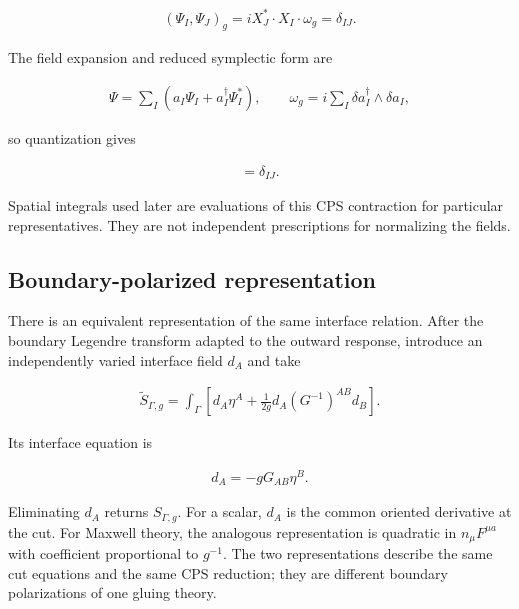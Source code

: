 \begin{align}
(\Psi_I,\Psi_J)_g
=iX_J^*\mathbin{\cdot}X_I\mathbin{\cdot}\omega_g
=\delta_{IJ}.
\end{align}

The field expansion and reduced symplectic form are

\begin{align}
\Psi=\sum_I\left(a_I\Psi_I+a_I^\dagger\Psi_I^*\right),
\qquad
\omega_g=i\sum_I\delta a_I^\dagger\wedge\delta a_I,
\end{align}

so quantization gives

\begin{align}
[a_I,a_J^\dagger]=\delta_{IJ}.
\end{align}

Spatial integrals used later are evaluations of this CPS contraction for particular representatives. They are not independent prescriptions for normalizing the fields.

\subsection{Boundary-polarized representation}\label{subsec:boundary-polarized}

There is an equivalent representation of the same interface relation. After the boundary Legendre transform adapted to the outward response, introduce an independently varied interface field $d_A$ and take

\begin{align}
\widetilde S_{\Gamma,g}
=\int_{\Gamma}\left[
d_A\eta^A+\frac{1}{2g}d_A(G^{-1})^{AB}d_B
\right].
\end{align}

Its interface equation is

\begin{align}
d_A=-gG_{AB}\eta^B.
\end{align}

Eliminating $d_A$ returns $S_{\Gamma,g}$. For a scalar, $d_A$ is the common oriented derivative at the cut. For Maxwell theory, the analogous representation is quadratic in $n_\mu F^{\mu a}$ with coefficient proportional to $g^{-1}$. The two representations describe the same cut equations and the same CPS reduction; they are different boundary polarizations of one gluing theory.
